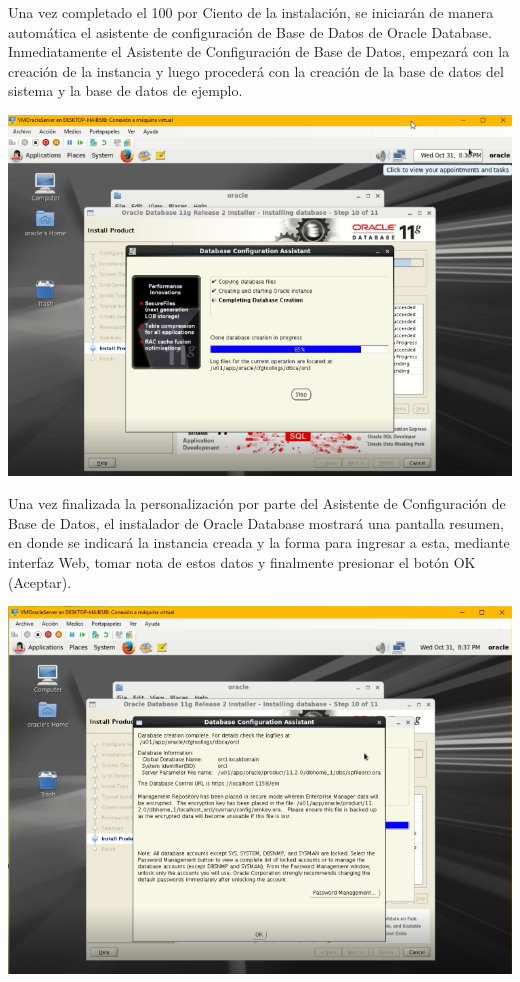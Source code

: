 \vspace{\baselineskip}

Una vez completado el 100 por Ciento de la instalación, se iniciarán de manera automática el asistente de configuración de Base de Datos de Oracle Database. Inmediatamente el Asistente de Configuración de Base de Datos, empezará con la creación de la instancia y luego procederá con la creación de la base de datos del sistema y la base de datos de ejemplo.
\begin{center}
	\includegraphics[width=14.5cm]{./Imagenes/83} 
\end{center}

\vspace{\baselineskip}

Una vez finalizada la personalización por parte del Asistente de Configuración de Base de Datos, el instalador de Oracle Database mostrará una pantalla resumen, en donde se indicará la instancia creada y la forma para ingresar a esta, mediante interfaz Web, tomar nota de estos datos y finalmente presionar el botón OK (Aceptar).
\begin{center}
	\includegraphics[width=14.5cm]{./Imagenes/84} 
\end{center}

